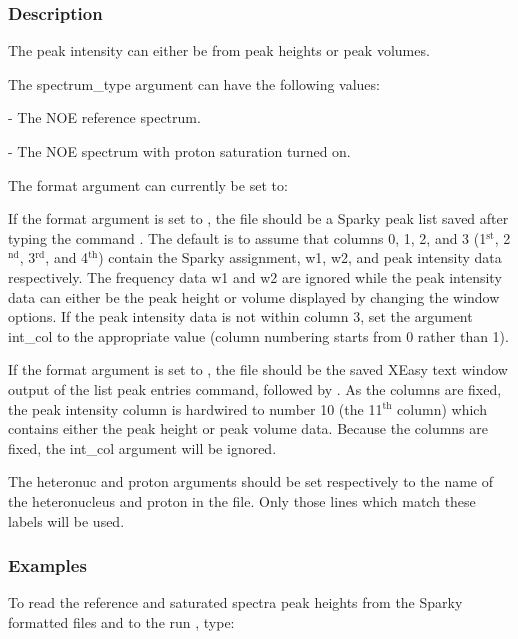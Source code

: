 \subsubsection{Description}

The peak intensity can either be from peak heights or peak volumes.


The spectrum\_type argument can have the following values:
    
 - The NOE reference spectrum.
    
 - The NOE spectrum with proton saturation turned on.


The format argument can currently be set to:
    

    


If the format argument is set to 
, the file should be a Sparky peak list saved after
typing the command 
.  The default is to assume that columns 0, 1, 2, and 3 (1$^\mathrm{st}$, 2$^\mathrm{nd}$,
3$^\mathrm{rd}$, and 4$^\mathrm{th}$) contain the Sparky assignment, w1, w2, and peak intensity data respectively.
The frequency data w1 and w2 are ignored while the peak intensity data can either be the
peak height or volume displayed by changing the window options.  If the peak intensity data
is not within column 3, set the argument int\_col to the appropriate value (column numbering
starts from 0 rather than 1).

If the format argument is set to 
, the file should be the saved XEasy text window
output of the list peak entries command, 
 followed by 
.  As the columns are fixed,
the peak intensity column is hardwired to number 10 (the 11$^\mathrm{th}$ column) which contains either
the peak height or peak volume data.  Because the columns are fixed, the int\_col argument
will be ignored.


The heteronuc and proton arguments should be set respectively to the name of the
heteronucleus and proton in the file.  Only those lines which match these labels will be
used.


\subsubsection{Examples}

To read the reference and saturated spectra peak heights from the Sparky formatted files
 and 
 to the run 
, type:

